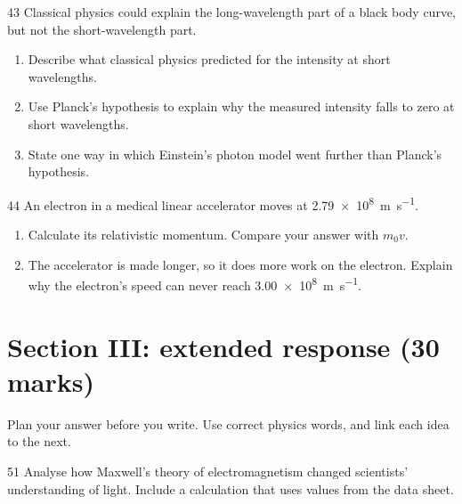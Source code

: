 \begin{practiceq}{4}{3}\label{pq:planck}
Classical physics could explain the long-wavelength part of a black body curve, but not the
short-wavelength part.
\begin{enumerate}[label=(\alph*)]
  \item Describe what classical physics predicted for the intensity at short wavelengths.
  \item Use Planck's hypothesis to explain why the measured intensity falls to zero at short
        wavelengths. 
  \item State one way in which Einstein's photon model went further than Planck's hypothesis.
\end{enumerate}
\end{practiceq}

\begin{practiceq}{4}{4}\label{pq:momentum}
An electron in a medical linear accelerator moves at \qty{2.79e8}{m.s^{-1}}.
\begin{enumerate}[label=(\alph*)]
  \item Calculate its relativistic momentum. Compare your answer with $m_0v$. 
  \item The accelerator is made longer, so it does more work on the electron. Explain why the
        electron's speed can never reach \qty{3.00e8}{m.s^{-1}}. 
\end{enumerate}
\end{practiceq}

\section*{Section III: extended response (30 marks)}
Plan your answer before you write. Use correct physics words, and link each idea to the next.

\begin{practiceq}{5}{1}\label{pq:maxwell}
Analyse how Maxwell's theory of electromagnetism changed scientists' understanding of light.
Include a calculation that uses values from the data sheet.
\end{practiceq}

